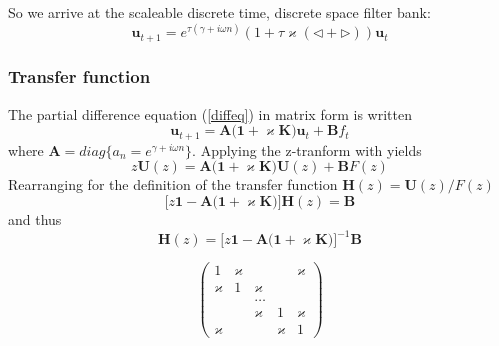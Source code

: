 \documentclass[11pt,twocolumn]{article}
\newcommand{\be}{\begin{equation}}
\newcommand{\ee}{\end{equation}}
\newcommand{\w}{\omega}
\newcommand{\ka}{\varkappa}
\newcommand{\um}{\scalebox{0.65}[1.0]{\( - \)}}  %
\newcommand{\leftshift}{\triangleleft}
\newcommand{\rightshift}{\triangleright}
\begin{document}
So we arrive at the scaleable discrete time, discrete space filter bank:
\be \label{dsdt_rescaled}
    \mathbf{u}_{t+1} = e^{\tau(\gamma + i \w n)} (1 + \tau\ka ( \leftshift + \rightshift )) \mathbf{u}_t
\ee







\subsubsection{Transfer function}

The partial difference equation (\ref{diffeq}) in matrix form is written
$$
    \mathbf{u}_{t+1} = \mathbf{A}\big( \mathbf{1} + \ka \mathbf{K} \big) \mathbf{u}_t + \mathbf{B}f_t
$$
where $ \mathbf{A} = diag\{a_n\!\!=\!e^{\gamma + i \w n}\}$.
Applying the z-tranform with yields
$$
    z\mathbf{U}(z) = \mathbf{A}\big( \mathbf{1} + \ka \mathbf{K} \big) \mathbf{U}(z) + \mathbf{B}F(z)
$$
Rearranging for the definition of the transfer function $\mathbf{H}(z) = \mathbf{U}(z)/F(z)$
$$
    \big[ z \mathbf{1} - \mathbf{A}\big( \mathbf{1} + \ka \mathbf{K} \big) \big] \mathbf{H}(z) = \mathbf{B}
$$
and thus
$$
    \mathbf{H}(z) = \big[ z \mathbf{1} - \mathbf{A}\big( \mathbf{1} + \ka \mathbf{K} \big) \big]^{-1} \mathbf{B}
$$


\be
\begin{pmatrix}
      1 & \ka &        &      & \ka  \\
    \ka &    1 &  \ka  &      &      \\
        &      & \dots &      &      \\
       &      &  \ka  &    1 & \ka  \\
    \ka &      &       & \ka  &   1
    \end{pmatrix}
\ee






\end{document}
